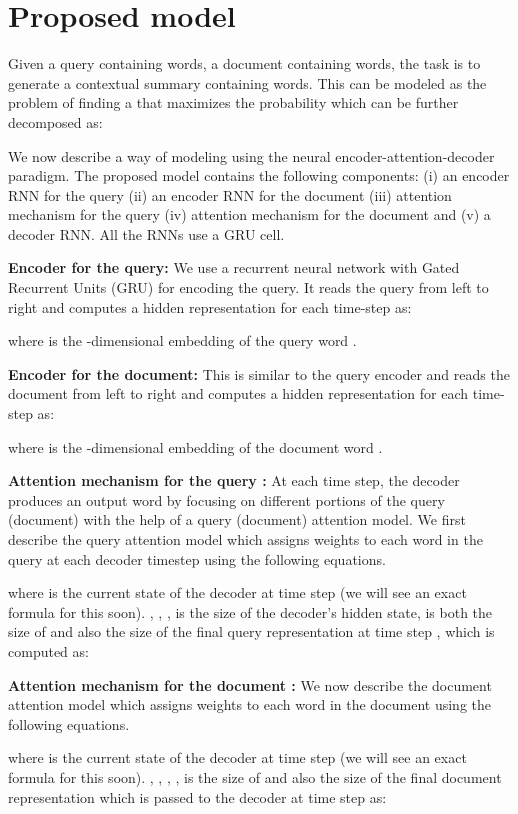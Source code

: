 \documentclass[11pt]{article}
\begin{document}
\section{Proposed model}
Given a query  containing  words, a document  containing  words, the task is to generate a contextual summary  containing  words. This can be modeled as the problem of finding  a  that maximizes the probability  which can be further decomposed as:


We now describe a way of modeling   using the neural encoder-attention-decoder paradigm. The proposed model contains the following components: (i) an encoder RNN for the query (ii) an encoder RNN for the document (iii) attention mechanism for the query (iv) attention mechanism for the document and (v) a decoder RNN. All the RNNs use a GRU cell.

\noindent \textbf{Encoder for the query:} We use a recurrent neural network with Gated Recurrent Units (GRU) for encoding the query. It reads the query  from left to right and computes a hidden representation for each time-step as:

where  is the -dimensional embedding of the query word . 

\noindent \textbf{Encoder for the document:} This is similar to the query encoder and reads the document  from left to right and computes a hidden representation for each time-step as: 

where  is the -dimensional embedding of the document word .

\noindent \textbf{Attention mechanism for the query :} At each time step, the decoder produces an output word by focusing on different portions of the query (document) with the help of a query (document) attention model. We first describe the query attention model which assigns weights  to each word in the query at each decoder timestep using the following equations.


where  is the current state of the decoder at time step  (we will see an exact formula for this soon). , , ,  is the size of the decoder's hidden state,  is both the size of  and also the size of the final query representation at time step , which is computed as:


\noindent \textbf{Attention mechanism for the document :} We now describe the document attention model which assigns weights to each word in the document using the following equations.


where  is the current state of the decoder at time step  (we will see an exact formula for this soon). , , , ,  is the size of  and also the size of the final document representation  which is passed to the decoder at time step  as:
\end{document}
